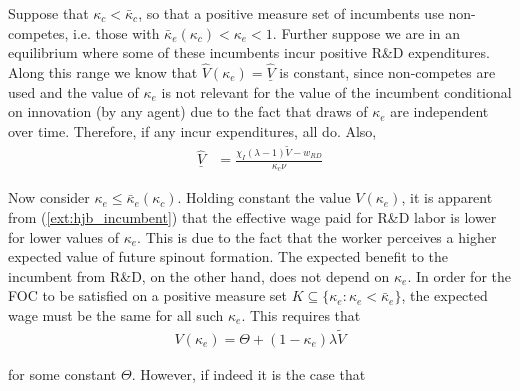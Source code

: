 Suppose that $\kappa_c < \bar{\kappa}_c$, so that a positive measure set of incumbents use non-competes, i.e. those with $\bar{\kappa}_e(\kappa_c) < \kappa_e < 1$. Further suppose we are in an equilibrium where some of these incumbents incur positive R\&D expenditures. Along this range we know that $\hat{V}(\kappa_e) = \hat{\underline{V}}$ is constant, since non-competes are used and the value of $\kappa_e$ is not relevant for the value of the incumbent conditional on innovation (by any agent) due to the fact that draws of $\kappa_e$ are independent over time. Therefore, if any incur expenditures, all do. Also, 
\begin{align}
	\hat{\underline{V}} &= \frac{\chi_I(\lambda-1) \tilde{V} - w_{RD}}{\kappa_c \nu }	
\end{align}

Now consider $\kappa_e \le \bar{\kappa}_e(\kappa_c)$. Holding constant the value $V(\kappa_e)$, it is apparent from (\ref{ext:hjb_incumbent}) that the effective wage paid for R\&D labor is lower for lower values of $\kappa_e$. This is due to the fact that the worker perceives a higher expected value of future spinout formation. The expected benefit to the incumbent from R\&D, on the other hand, does not depend on $\kappa_e$. In order for the FOC to be satisfied on a positive measure set $K \subseteq \{ \kappa_e: \kappa_e < \bar{\kappa}_e \}$, the expected wage must be the same for all such $\kappa_e$. This requires that
\begin{align}
	V(\kappa_e) = \Theta + (1-\kappa_e)\lambda \tilde{V} 
\end{align}

for some constant $\Theta$. However, if indeed it is the case that 